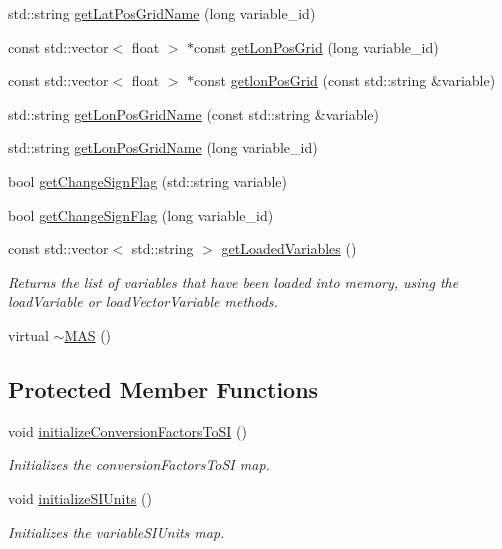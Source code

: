 \begin{DoxyCompactItemize}
std\-::string \hyperlink{classccmc_1_1_m_a_s_a2001608a37a8dfc35b4981d0397be7f0}{get\-Lat\-Pos\-Grid\-Name} (long variable\-\_\-id)
\item 
const std\-::vector$<$ float $>$ $\ast$const \hyperlink{classccmc_1_1_m_a_s_a1162c5d869616eb5085525a520897dfe}{get\-Lon\-Pos\-Grid} (long variable\-\_\-id)
\item 
const std\-::vector$<$ float $>$ $\ast$const \hyperlink{classccmc_1_1_m_a_s_aa463b73b90175dd3a4067807a5794613}{getlon\-Pos\-Grid} (const std\-::string \&variable)
\item 
std\-::string \hyperlink{classccmc_1_1_m_a_s_a00aa9361fb3997403ca55311f95689d2}{get\-Lon\-Pos\-Grid\-Name} (const std\-::string \&variable)
\item 
std\-::string \hyperlink{classccmc_1_1_m_a_s_aeaba6800251f922352e98865deba9a23}{get\-Lon\-Pos\-Grid\-Name} (long variable\-\_\-id)
\item 
bool \hyperlink{classccmc_1_1_m_a_s_a33a19b98d4e265ecbdb8eb1f0870017b}{get\-Change\-Sign\-Flag} (std\-::string variable)
\item 
bool \hyperlink{classccmc_1_1_m_a_s_a39e6ce2453ed357f6233a45ee470a02f}{get\-Change\-Sign\-Flag} (long variable\-\_\-id)
\item 
const std\-::vector$<$ std\-::string $>$ \hyperlink{classccmc_1_1_m_a_s_afee47f580c257809729f39f77f26229b}{get\-Loaded\-Variables} ()
\begin{DoxyCompactList}\small\item\em Returns the list of variables that have been loaded into memory, using the load\-Variable or load\-Vector\-Variable methods. \end{DoxyCompactList}\item 
virtual \hyperlink{classccmc_1_1_m_a_s_a92b3216af9c4e6d456d1826ed0b17801}{$\sim$\-M\-A\-S} ()
\end{DoxyCompactItemize}
\subsection*{Protected Member Functions}
\begin{DoxyCompactItemize}
\item 
void \hyperlink{classccmc_1_1_m_a_s_abb1b32fcba0ca5bc7eabae7d2042e3ce}{initialize\-Conversion\-Factors\-To\-S\-I} ()
\begin{DoxyCompactList}\small\item\em Initializes the conversion\-Factors\-To\-S\-I map. \end{DoxyCompactList}\item 
void \hyperlink{classccmc_1_1_m_a_s_a9b6c97641c9cdcacc71e706c82f0ef3d}{initialize\-S\-I\-Units} ()
\begin{DoxyCompactList}\small\item\em Initializes the variable\-S\-I\-Units map. \end{DoxyCompactList}\end{DoxyCompactItemize}
